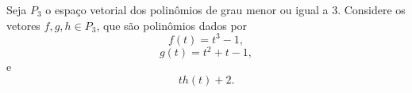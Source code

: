 Seja $P_3$ o espaço vetorial dos polinômios de grau menor ou igual a $3$. Considere os vetores $f,g,h\in P_3$, que são polinômios dados por
\[f(t)=t^3-1,\]
\[g(t)=t^2+t-1,\]
e
\[th(t)+2.\]
